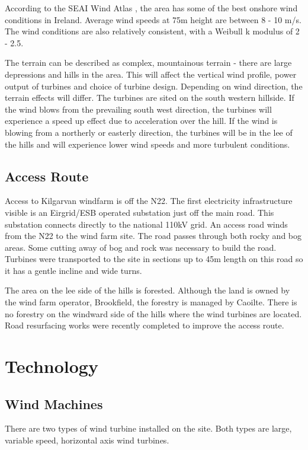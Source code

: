 \documentclass[12pt]{article} %
\begin{document}
According to the SEAI Wind Atlas \cite{seai_atlas}, the area has some of the best onshore wind conditions in Ireland. Average wind speeds at 75m height are between 8 - 10 m/s. The wind conditions are also relatively consistent, with a Weibull k modulus of 2 - 2.5.

The terrain can be described as complex, mountainous terrain - there are large depressions and hills in the area. This will affect the vertical wind profile, power output of turbines and choice of turbine design.
Depending on wind direction, the terrain effects will differ. 
The turbines are sited on the south western hillside. If the wind blows from the prevailing south west direction, the turbines will experience a speed up effect due to acceleration over the hill.
If the wind is blowing from a northerly or easterly direction, the turbines will be in the lee of the hills and will experience lower wind speeds and more turbulent conditions.


\subsection{Access Route}
Access to Kilgarvan windfarm is off the N22. 
The first electricity infrastructure visible is an Eirgrid/ESB operated substation just off the main road. This substation connects directly to the national 110kV grid.
An access road winds from the N22 to the wind farm site. The road passes through both rocky and bog areas. Some cutting away of bog and rock was necessary to build the road. Turbines were transported to the site in sections up to 45m length on this road so it has a gentle incline and wide turns.

The area on the lee side of the hills is forested. Although the land is owned by the wind farm operator, Brookfield, the forestry is managed by Caoilte.
There is no forestry on the windward side of the hills where the wind turbines are located.
Road resurfacing works were recently completed to improve the access route.



\section{Technology}
\subsection{Wind Machines}

There are two types of wind turbine installed on the site. Both types are large, variable speed, horizontal axis wind turbines.
\end{document}

